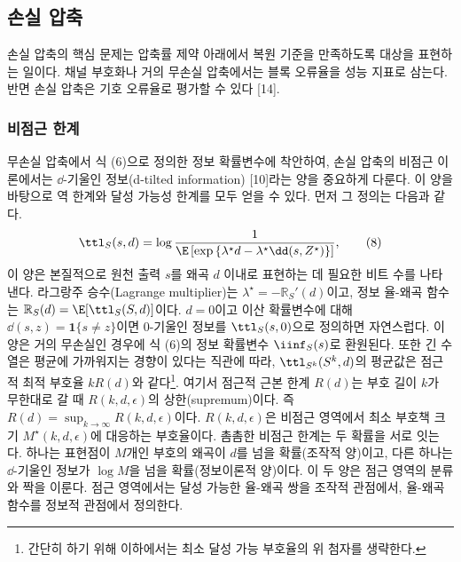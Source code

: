 \subsection{손실 압축}

손실 압축의 핵심 문제는 압축률 제약 아래에서 복원 기준을 만족하도록 대상을 표현하는 일이다.
채널 부호화나 거의 무손실 압축에서는 블록 오류율을 성능 지표로 삼는다.
반면 손실 압축은 기호 오류율로 평가할 수 있다 [14].

\subsubsection{비점근 한계}

무손실 압축에서 식 (6)으로 정의한 정보 확률변수에 착안하여, 손실 압축의 비점근 이론에서는 $\dd$-기울인 정보(d-tilted information) [10]라는 양을 중요하게 다룬다.
이 양을 바탕으로 역 한계와 달성 가능성 한계를 모두 얻을 수 있다.
먼저 그 정의는 다음과 같다.
\begin{equation}
  \ttl_S(s,d) = \log \frac{1}{\E\left[\exp\left\{\lambda^\star d - \lambda^\star \dd(s,Z^\star)\right\}\right]},
  \tag{8}
\end{equation}
이 양은 본질적으로 원천 출력 $s$를 왜곡 $d$ 이내로 표현하는 데 필요한 비트 수를 나타낸다.
라그랑주 승수(Lagrange multiplier)는 $\lambda^\star = -\mathbb{R}_S'(d)$이고, 정보 율-왜곡 함수는 $\mathbb{R}_S(d) = \E[\ttl_S(S,d)]$이다.
$d=0$이고 이산 확률변수에 대해 $\dd(s,z)=\mathbf{1}\{s\neq z\}$이면 0-기울인 정보를 $\ttl_S(s,0)$으로 정의하면 자연스럽다.
이 양은 거의 무손실인 경우에 식 (6)의 정보 확률변수 $\iinf_S(s)$로 환원된다.
또한 긴 수열은 평균에 가까워지는 경향이 있다는 직관에 따라, $\ttl_{S^k}(S^k,d)$의 평균값은 점근적 최적 부호율 $kR(d)$와 같다\footnote{간단히 하기 위해 이하에서는 최소 달성 가능 부호율의 위 첨자를 생략한다.}.
여기서 점근적 근본 한계 $R(d)$는 부호 길이 $k$가 무한대로 갈 때 $R(k,d,\epsilon)$의 상한(supremum)이다. 즉 $R(d)=\sup_{k\to\infty} R(k,d,\epsilon)$이다.
$R(k,d,\epsilon)$은 비점근 영역에서 최소 부호책 크기 $M^\star(k,d,\epsilon)$에 대응하는 부호율이다.
촘촘한 비점근 한계는 두 확률을 서로 잇는다.
하나는 표현점이 $M$개인 부호의 왜곡이 $d$를 넘을 확률(조작적 양)이고, 다른 하나는 $\dd$-기울인 정보가 $\log M$을 넘을 확률(정보이론적 양)이다.
이 두 양은 점근 영역의 분류와 짝을 이룬다.
점근 영역에서는 달성 가능한 율-왜곡 쌍을 조작적 관점에서, 율-왜곡 함수를 정보적 관점에서 정의한다.

